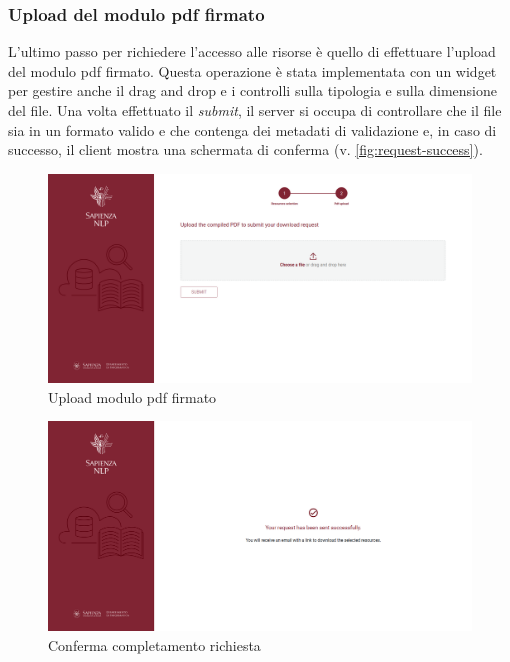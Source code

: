 \subsubsection{Upload del modulo pdf firmato} \label{subsec:pdf-upload}
L'ultimo passo per richiedere l'accesso alle risorse è quello di effettuare
l'upload del modulo pdf firmato. Questa operazione è stata implementata con un
widget per gestire anche il drag and drop e i controlli sulla tipologia e sulla
dimensione del file. Una volta effettuato il \textit{submit}, il server si occupa
di controllare che il file sia in un formato valido e che contenga dei metadati
di validazione e, in caso di successo, il client mostra una schermata di conferma
(v. \autoref{fig:request-success}).

\begin{figure}[H]
	\centering
	\includegraphics[width=\textwidth]{assets/ui/pdf-upload.png}
	\caption{Upload modulo pdf firmato}
	\label{fig:pdf-upload}
\end{figure}

\begin{figure}[H]
	\centering
	\includegraphics[width=\textwidth]{assets/ui/request-success.png}
	\caption{Conferma completamento richiesta}
	\label{fig:request-success}
\end{figure}

